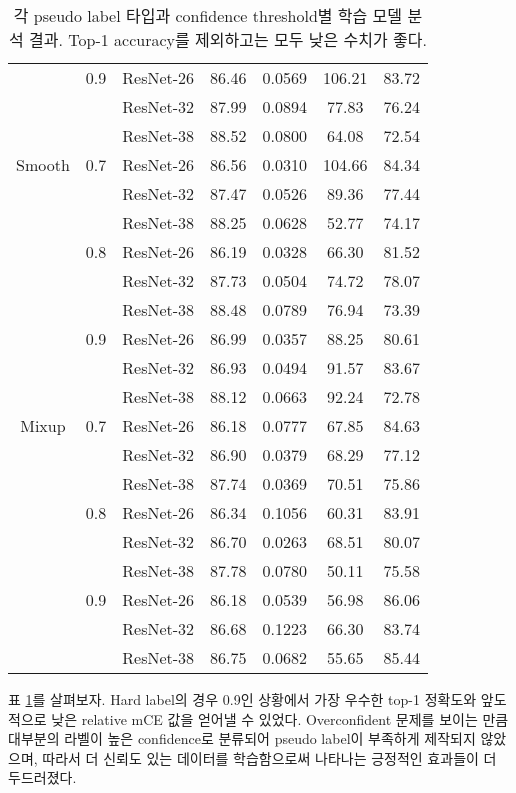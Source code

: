 \begin{table}[!h]
\begin{tabular}{|c|c|c|c|c|c|c|}
     & 0.9 & ResNet-26 & 86.46 & 0.0569 & 106.21 & 83.72 \\
     &  & ResNet-32 & 87.99 & 0.0894 & 77.83 & 76.24 \\
     &  & ResNet-38 & 88.52 & 0.0800 & 64.08 & 72.54 \\ \hline
    Smooth & 0.7 & ResNet-26 & 86.56 & 0.0310 & 104.66 & 84.34 \\
     &  & ResNet-32 & 87.47 & 0.0526 & 89.36 & 77.44 \\
     &  & ResNet-38 & 88.25 & 0.0628 & 52.77 & 74.17 \\ \hhline{|~|-|-|-|-|-|-|}
     & 0.8 & ResNet-26 & 86.19 & 0.0328 & 66.30 & 81.52 \\
     &  & ResNet-32 & 87.73 & 0.0504 & 74.72 & 78.07 \\
     &  & ResNet-38 & 88.48 & 0.0789 & 76.94 & 73.39 \\ \hhline{|~|-|-|-|-|-|-|}
     & 0.9 & ResNet-26 & 86.99 & 0.0357 & 88.25 & 80.61 \\
     &  & ResNet-32 & 86.93 & 0.0494 & 91.57 & 83.67 \\
     &  & ResNet-38 & 88.12 & 0.0663 & 92.24 & 72.78 \\ \hline
    Mixup & 0.7 & ResNet-26 & 86.18 & 0.0777 & 67.85 & 84.63 \\
     &  & ResNet-32 & 86.90 & 0.0379 & 68.29 & 77.12 \\
     &  & ResNet-38 & 87.74 & 0.0369 & 70.51 & 75.86 \\ \hhline{|~|-|-|-|-|-|-|}
     & 0.8 & ResNet-26 & 86.34 & 0.1056 & 60.31 & 83.91 \\
     &  & ResNet-32 & 86.70 & 0.0263 & 68.51 & 80.07 \\
     &  & ResNet-38 & 87.78 & 0.0780 & 50.11 & 75.58 \\ \hhline{|~|-|-|-|-|-|-|}
     & 0.9 & ResNet-26 & 86.18 & 0.0539 & 56.98 & 86.06 \\
     &  & ResNet-32 & 86.68 & 0.1223 & 66.30 & 83.74 \\
     &  & ResNet-38 & 86.75 & 0.0682 & 55.65 & 85.44 \\ \hline
  \end{tabular}
  \caption{각 pseudo label 타입과 confidence threshold별 학습 모델 분석 결과. Top-1 accuracy를 제외하고는 모두 낮은 수치가 좋다.}
  \label{ablation_confidence}
\end{table}

표 \ref{ablation_confidence}를 살펴보자. Hard label의 경우 0.9인 상황에서 가장 우수한 top-1 정확도와 앞도적으로 낮은 relative mCE 값을 얻어낼 수 있었다. Overconfident 문제를 보이는 만큼 대부분의 라벨이 높은 confidence로 분류되어 pseudo label이 부족하게 제작되지 않았으며, 따라서 더 신뢰도 있는 데이터를 학습함으로써 나타나는 긍정적인 효과들이 더 두드러졌다.

